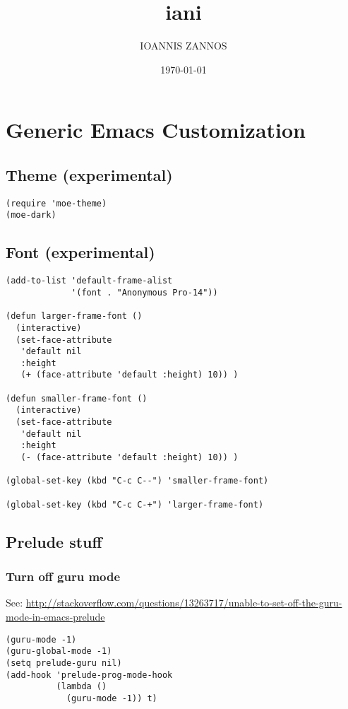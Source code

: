 \documentclass{article}
\author{IOANNIS ZANNOS}
\date{\today}
\title{iani}
\begin{document}
\maketitle
\tableofcontents

\section{Generic Emacs Customization}
\label{sec-1}
\subsection{Theme (experimental)}
\label{sec-1-1}

\begin{verbatim}
(require 'moe-theme)
(moe-dark)
\end{verbatim}
\subsection{Font (experimental)}
\label{sec-1-2}

\begin{verbatim}
(add-to-list 'default-frame-alist
             '(font . "Anonymous Pro-14"))

(defun larger-frame-font ()
  (interactive)
  (set-face-attribute
   'default nil
   :height
   (+ (face-attribute 'default :height) 10)) )

(defun smaller-frame-font ()
  (interactive)
  (set-face-attribute
   'default nil
   :height
   (- (face-attribute 'default :height) 10)) )

(global-set-key (kbd "C-c C--") 'smaller-frame-font)

(global-set-key (kbd "C-c C-+") 'larger-frame-font)
\end{verbatim}

\subsection{Prelude stuff}
\label{sec-1-3}
\subsubsection{Turn off guru mode}
\label{sec-1-3-1}
See: \url{http://stackoverflow.com/questions/13263717/unable-to-set-off-the-guru-mode-in-emacs-prelude}

\begin{verbatim}
(guru-mode -1)
(guru-global-mode -1)
(setq prelude-guru nil)
(add-hook 'prelude-prog-mode-hook
          (lambda ()
            (guru-mode -1)) t)
\end{verbatim}
\end{document}

